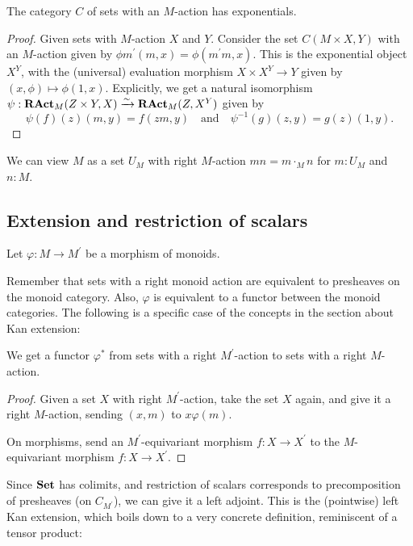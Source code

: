 \begin{lemma}
  The category $ C $ of sets with an $ M $-action has exponentials.
\end{lemma}
\begin{proof}
  Given sets with $ M $-action $ X $ and $ Y $. Consider the set $ C(M \times X, Y) $ with an $ M $-action given by $ \phi m^\prime(m, x) = \phi(m^\prime m, x) $. This is the exponential object $ X^Y $, with the (universal) evaluation morphism $ X \times X^Y \to Y $ given by $ (x, \phi) \mapsto \phi(1, x) $. Explicitly, we get a natural isomorphism $ \psi: \mathbf{RAct}_{M}(Z \times Y, X) \xrightarrow \sim \mathbf{RAct}_{M}(Z, X^Y) $ given by
  \[ \psi(f)(z)(m, y) = f(z m, y) \quad \text{and} \quad \psi^{-1}(g)(z, y) = g(z)(1, y). \]
\end{proof}

\begin{definition}
  We can view $ M $ as a set $ U_M $ with right $ M $-action $ m n = m \cdot_M n $ for $ m: U_M $ and $ n: M $.
\end{definition}

\subsection{Extension and restriction of scalars}

Let $ \varphi: M \to M^\prime $ be a morphism of monoids.

Remember that sets with a right monoid action are equivalent to presheaves on the monoid category. Also, $ \varphi $ is equivalent to a functor between the monoid categories. The following is a specific case of the concepts in the section about Kan extension:

\begin{lemma}
  We get a  functor $ \varphi^* $ from sets with a right $ M^\prime $-action to sets with a right $ M $-action.
\end{lemma}
\begin{proof}
  Given a set $ X $ with right $ M^\prime $-action, take the set $ X $ again, and give it a right $ M $-action, sending $ (x, m) $ to $ x \varphi(m) $.

  On morphisms, send an $ M^\prime $-equivariant morphism $ f: X \to X^\prime $ to the $ M $-equivariant morphism $ f: X \to X^\prime $.
\end{proof}

Since $ \mathbf{Set} $ has colimits, and restriction of scalars corresponds to precomposition of presheaves (on $ C_{M^\prime} $), we can give it a left adjoint. This is the (pointwise) left Kan extension, which boils down to a very concrete definition, reminiscent of a tensor product:


